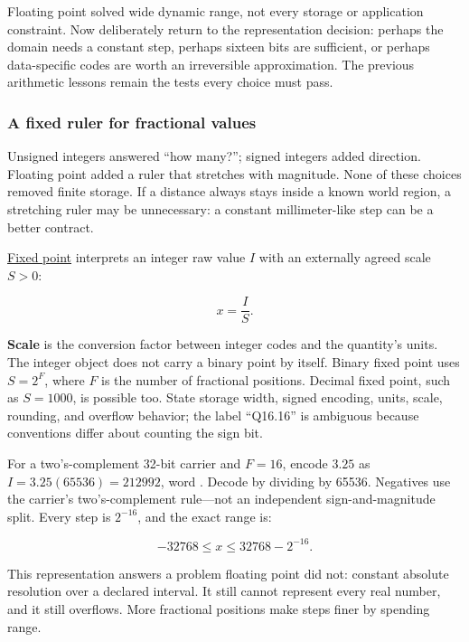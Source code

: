 \hypertarget{01-foundations-i-ch001-choosing-what-information-to-keep}{}

Floating point solved wide dynamic range, not every storage or application constraint. Now deliberately return to the representation decision: perhaps the domain needs a constant step, perhaps sixteen bits are sufficient, or perhaps data-specific codes are worth an irreversible approximation. The previous arithmetic lessons remain the tests every choice must pass.

\subsubsection{A fixed ruler for fractional values}\label{01-foundations-i-ch001-a-fixed-ruler-for-fractional-values}

\hypertarget{01-foundations-i-ch001-a-fixed-ruler-for-fractional-values}{}

Unsigned integers answered ``how many?''; signed integers added direction. Floating point added a ruler that stretches with magnitude. None of these choices removed finite storage. If a distance always stays inside a known world region, a stretching ruler may be unnecessary: a constant millimeter-like step can be a better contract.

\hyperref[appendix-1d0dbe8924cc]{Fixed point} interprets an integer raw value \(I\) with an externally agreed scale \(S>0\):

\[
x=\frac{I}{S}.
\]

\textbf{Scale} is the conversion factor between integer codes and the quantity's units. The integer object does not carry a binary point by itself. Binary fixed point uses \(S=2^F\), where \(F\) is the number of fractional positions. Decimal fixed point, such as \(S=1000\), is possible too. State storage width, signed encoding, units, scale, rounding, and overflow behavior; the label ``Q16.16'' is ambiguous because conventions differ about counting the sign bit.

For a two's-complement 32-bit carrier and \(F=16\), encode \(3.25\) as \(I=3.25(65536)=212992\), word . Decode by dividing by 65536. Negatives use the carrier's two's-complement rule---not an independent sign-and-magnitude split. Every step is \(2^{-16}\), and the exact range is:

\[
-32768\le x\le32768-2^{-16}.
\]

This representation answers a problem floating point did not: constant absolute resolution over a declared interval. It still cannot represent every real number, and it still overflows. More fractional positions make steps finer by spending range.

